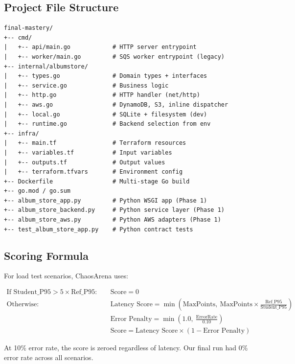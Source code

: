 \documentclass[11pt]{article}
\begin{document}
\subsection{Project File Structure}

\begin{lstlisting}
final-mastery/
+-- cmd/
|   +-- api/main.go            # HTTP server entrypoint
|   +-- worker/main.go         # SQS worker entrypoint (legacy)
+-- internal/albumstore/
|   +-- types.go               # Domain types + interfaces
|   +-- service.go             # Business logic
|   +-- http.go                # HTTP handler (net/http)
|   +-- aws.go                 # DynamoDB, S3, inline dispatcher
|   +-- local.go               # SQLite + filesystem (dev)
|   +-- runtime.go             # Backend selection from env
+-- infra/
|   +-- main.tf                # Terraform resources
|   +-- variables.tf           # Input variables
|   +-- outputs.tf             # Output values
|   +-- terraform.tfvars       # Environment config
+-- Dockerfile                 # Multi-stage Go build
+-- go.mod / go.sum
+-- album_store_app.py         # Python WSGI app (Phase 1)
+-- album_store_backend.py     # Python service layer (Phase 1)
+-- album_store_aws.py         # Python AWS adapters (Phase 1)
+-- test_album_store_app.py    # Python contract tests
\end{lstlisting}

\subsection{Scoring Formula}

For load test scenarios, ChaosArena uses:

\begin{align*}
\text{If } \text{Student\_P95} > 5 \times \text{Ref\_P95}: \quad & \text{Score} = 0 \\[6pt]
\text{Otherwise}: \quad & \text{Latency Score} = \min(\text{MaxPoints},\ \text{MaxPoints} \times \frac{\text{Ref\_P95}}{\text{Student\_P95}}) \\
& \text{Error Penalty} = \min(1.0,\ \frac{\text{ErrorRate}}{0.10}) \\
& \text{Score} = \text{Latency Score} \times (1 - \text{Error Penalty})
\end{align*}

At 10\% error rate, the score is zeroed regardless of latency. Our final run had 0\% error rate across all scenarios.
\end{document}
